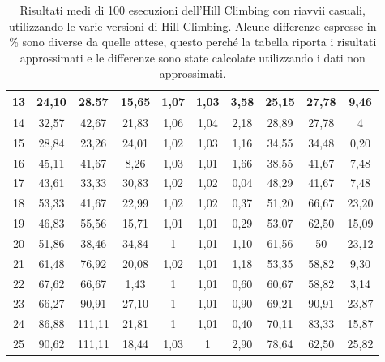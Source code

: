 \begin{table}[]
{\begin{tabular}{|c|c|c|c|c|c|c|c|c|c|}
13 & 24,10         & 28.57          & 15,65           & 1,07             & 1,03             & 3,58              & 25,15         & 27,78          & 9,46           \\ \hline
14 & 32,57         & 42,67          & 21,83           & 1,06             & 1,04             & 2,18              & 28,89         & 27,78          & 4              \\ \hline
15 & 28,84         & 23,26          & 24,01           & 1,02             & 1,03             & 1,16              & 34,55         & 34,48          & 0,20           \\ \hline
16 & 45,11         & 41,67          & 8,26            & 1,03             & 1,01             & 1,66              & 38,55         & 41,67          & 7,48           \\ \hline
17 & 43,61         & 33,33          & 30,83           & 1,02             & 1,02             & 0,04              & 48,29         & 41,67          & 7,48           \\ \hline
18 & 53,33         & 41,67          & 22,99           & 1,02             & 1,02             & 0,37              & 51,20         & 66,67          & 23,20          \\ \hline
19 & 46,83         & 55,56          & 15,71           & 1,01             & 1,01             & 0,29              & 53,07         & 62,50          & 15,09          \\ \hline
20 & 51,86         & 38,46          & 34,84           & 1                & 1,01             & 1,10              & 61,56         & 50             & 23,12          \\ \hline
21 & 61,48         & 76,92          & 20,08           & 1,02             & 1,01             & 1,18              & 53,35         & 58,82          & 9,30           \\ \hline
22 & 67,62         & 66,67          & 1,43            & 1                & 1,01             & 0,60              & 60,67         & 58,82          & 3,14           \\ \hline
23 & 66,27         & 90,91          & 27,10           & 1                & 1,01             & 0,90              & 69,21         & 90,91          & 23,87          \\ \hline
24 & 86,88         & 111,11         & 21,81           & 1                & 1,01             & 0,40              & 70,11         & 83,33          & 15,87          \\ \hline
25 & 90,62         & 111,11         & 18,44           & 1,03             & 1                & 2,90              & 78,64         & 62,50          & 25,82          \\ \hline
\end{tabular}
}
\caption{Risultati medi di 100 esecuzioni dell'Hill Climbing con riavvii casuali, utilizzando le varie versioni di Hill Climbing. Alcune differenze espresse in \% sono diverse da quelle attese, questo perché la tabella riporta i risultati approssimati e le differenze sono state calcolate utilizzando i dati non approssimati.}
\label{table:riavvii}
\end{table}